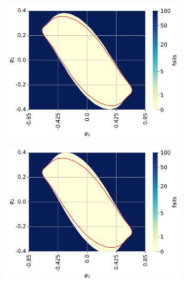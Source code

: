  \begin{figure}[h!]
     \centering
     \begin{subfigure}[t]{0.32\textwidth}
         \centering
         \includegraphics[width=\textwidth]{Figures/DP_len_1.1.png}
         \label{fig: DP len 1.1}
         \caption{}
     \end{subfigure}
     \hfill
     \begin{subfigure}[t]{0.32\textwidth}
         \centering
         \includegraphics[width=\textwidth]{Figures/DP_len_1.2.png}
         \label{fig: DP len 1.2}
         \caption{}
     \end{subfigure}
     \hfill
     \begin{subfigure}[t]{0.32\textwidth}

\end{subfigure}
\end{figure}
